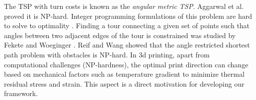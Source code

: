   The TSP with turn costs is known as the \emph{angular metric TSP}.
  Aggarwal et al.~\cite{AgCoKhMoSc2000} proved it is NP-hard. 
  Integer programming formulations of this problem are hard to solve to optimality \cite{AiAnFrJUlAl2017}. 
  Finding a tour connecting a given set of points such that angles between two adjacent edges of the tour is constrained was studied by Fekete and Woeginger \cite{FeWo1997}. 
  Reif and Wang \cite{ReWa1998} showed that the angle restricted shortest path problem with obstacles is NP-hard.
  In 3d printing, apart from computational challenges (NP-hardness), the optimal print direction can change based on mechanical factors such as temperature gradient to minimize thermal residual stress and strain.
  This aspect is a direct motivation for developing our framework.
  
